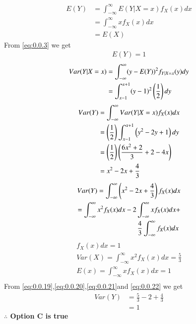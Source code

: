 \documentclass[journal,12pt,twocolumn]{IEEEtran}
\begin{document}
\begin{align}
    E(Y)&=\int_{-\infty}^{\infty}E(Y|X=x)f_{X}(x)dx\\
    &=\int_{-\infty}^{\infty}xf_{X}(x)dx\\
    &=E(X)
\end{align}
From \eqref{eq:0.0.3} we get 
\begin{align}
    E(Y)=1
\end{align}
\begin{align}
    Var(Y|X=x)&=\int_{-\infty}^{\infty}(y-E(Y))^2f_{Y|X=x}(y)dy\\
    &=\int_{x-1}^{x+1}(y-1)^2\left(\frac{1}{2}\right)dy
\end{align}
\begin{align}
    Var(Y)&=\int_{-\infty}^{\infty}Var(Y|X=x)f_{X}(x)dx\\
    &=\left(\frac{1}{2}\right)\int_{x-1}^{x+1}\left(y^2-2y+1\right)dy\\
    &=\left(\frac{1}{2}\right)\left(\frac{6x^2+2}{3}+2-4x\right)\\
    &=x^2-2x+\frac{4}{3}
\end{align}
\begin{align}
  Var(Y)=\int_{-\infty}^{\infty}\left(x^2-2x+\frac{4}{3}\right)f_{X}(x)dx\\
   =\int_{-\infty}^{\infty}x^2f_{X}(x)dx-2\int_{-\infty}^{\infty}xf_{X}(x)dx+\\\label{eq:0.0.19}\frac{4}{3}\int_{-\infty}^{\infty}f_{X}(x)dx\
 \end{align}
\begin{align}
  f_{X}(x)dx=1\\\label{eq:0.0.20}
 Var(X)=\int_{-\infty}^{\infty}x^2f_{X}(x)dx=\frac{5}{3}\\\label{eq:0.0.21}
 E(x)=\int_{-\infty}^{\infty}xf_{X}(x)dx=1\\\label{eq:0.0.22}
 \end{align}
 From \eqref{eq:0.0.19},\eqref{eq:0.0.20},\eqref{eq:0.0.21}and \eqref{eq:0.0.22} we get
 \begin{align}
     Var(Y)&=\frac{5}{3}-2+\frac{4}{3}\\
     &=1
 \end{align}
\textbf{$\therefore$ Option C is true}
\end{document}
